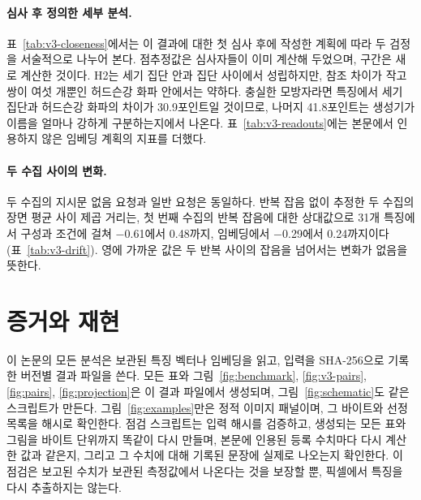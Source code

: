 \paragraph{심사 후 정의한 세부 분석.} 표~\ref{tab:v3-closeness}에서는 이 결과에 대한 첫 심사 후에
작성한 계획에 따라 두 검정을 서술적으로 나누어 본다. 점추정값은 심사자들이 이미 계산해 두었으며, 구간은
새로 계산한 것이다. H2는 세기 집단 안과 집단 사이에서 성립하지만, 참조 차이가 작고 쌍이 여섯 개뿐인
허드슨강 화파 안에서는 약하다. 충실한 모방자라면 특징에서 세기 집단과 허드슨강 화파의 차이가
30.9포인트일 것이므로, 나머지 41.8포인트는 생성기가 이름을 얼마나 강하게 구분하는지에서 나온다.
표~\ref{tab:v3-readouts}에는 본문에서 인용하지 않은 임베딩 계획의 지표를 더했다.






\paragraph{두 수집 사이의 변화.} 두 수집의 지시문 없음 요청과 일반 요청은 동일하다. 반복 잡음 없이
추정한 두 수집의 장면 평균 사이 제곱 거리는, 첫 번째 수집의 반복 잡음에 대한 상대값으로 31개 특징에서
구성과 조건에 걸쳐 $-$0.61에서 0.48까지, 임베딩에서 $-$0.29에서 0.24까지이다(표~\ref{tab:v3-drift}).
영에 가까운 값은 두 반복 사이의 잡음을 넘어서는 변화가 없음을 뜻한다.



\FloatBarrier
\section{증거와 재현}\label{app:replay}

이 논문의 모든 분석은 보관된 특징 벡터나 임베딩을 읽고, 입력을 SHA-256으로 기록한 버전별 결과 파일을
쓴다. 모든 표와 그림~\ref{fig:benchmark}, \ref{fig:v3-pairs}, \ref{fig:pairs}, \ref{fig:projection}은
이 결과 파일에서 생성되며, 그림~\ref{fig:schematic}도 같은 스크립트가 만든다. 그림~\ref{fig:examples}만은
정적 이미지 패널이며, 그 바이트와 선정 목록을 해시로 확인한다. 점검 스크립트는 입력 해시를 검증하고,
생성되는 모든 표와 그림을 바이트 단위까지 똑같이 다시 만들며, 본문에 인용된 등록 수치마다 다시 계산한
값과 같은지, 그리고 그 수치에 대해 기록된 문장에 실제로 나오는지 확인한다. 이 점검은 보고된 수치가
보관된 측정값에서 나온다는 것을 보장할 뿐, 픽셀에서 특징을 다시 추출하지는 않는다.
